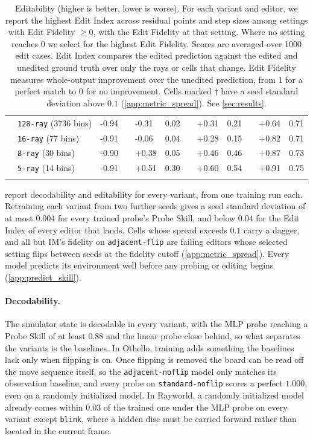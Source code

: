 \documentclass{article} %
\begin{document}
\begin{table}[t]
\begin{tabular}{ll E G EF G EF G EF}
& \texttt{128-ray} (3736 bins) & -0.94 & & -0.31 & 0.02 & & +0.31 & 0.21 & & +0.64 & 0.71 \\
& \texttt{16-ray} (77 bins)    & -0.91 & & -0.06 & 0.04 & & +0.28 & 0.15 & & +0.82 & 0.71 \\
& \texttt{8-ray} (30 bins)     & -0.90 & & +0.38 & 0.05 & & +0.46 & 0.46 & & +0.87 & 0.73 \\
& \texttt{5-ray} (14 bins)     & -0.91 & & +0.51 & 0.30 & & +0.60 & 0.54 & & +0.91 & 0.75 \\
\noalign{\vspace{0.75em}}
\hline
\end{tabular}
\caption{Editability (\textcolor{heatHiTxt}{higher} is better, \textcolor{heatLo}{lower} is worse). For each variant and editor, we report the highest Edit Index across residual points and step sizes among settings with Edit Fidelity $\geq 0$, with the Edit Fidelity at that setting. Where no setting reaches $0$ we select for the highest Edit Fidelity. Scores are averaged over 1000 edit cases. Edit Index compares the edited prediction against the edited and unedited ground truth over only the rays or cells that change. Edit Fidelity measures whole-output improvement over the unedited prediction, from $1$ for a perfect match to $0$ for no improvement. Cells marked $\dagger$ have a seed standard deviation above $0.1$ (\cref{app:metric_spread}). See \cref{sec:results}.}
\label{tab:editability}
\end{table}

 report decodability and editability for every variant, from one training run each. Retraining each variant from two further seeds gives a seed standard deviation of at most $0.004$ for every trained probe's Probe Skill, and below $0.04$ for the Edit Index of every editor that lands. Cells whose spread exceeds $0.1$ carry a dagger, and all but IM's fidelity on \texttt{adjacent-flip} are failing editors whose selected setting flips between seeds at the fidelity cutoff (\cref{app:metric_spread}). Every model predicts its environment well before any probing or editing begins (\cref{app:predict_skill}).

\paragraph{Decodability.}
The simulator state is decodable in every variant, with the MLP probe reaching a Probe Skill of at least $0.88$ and the linear probe close behind, so what separates the variants is the baselines. In Othello, training adds something the baselines lack only when flipping is on. Once flipping is removed the board can be read off the move sequence itself, so the \texttt{adjacent-noflip} model only matches its observation baseline, and every probe on \texttt{standard-noflip} scores a perfect $1.000$, even on a randomly initialized model. In Rayworld, a randomly initialized model already comes within $0.03$ of the trained one under the MLP probe on every variant except \texttt{blink}, where a hidden disc must be carried forward rather than located in the current frame.
\end{document}
